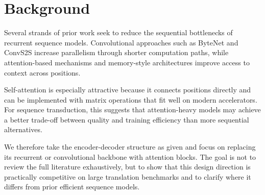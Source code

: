 \section{Background}

Several strands of prior work seek to reduce the sequential bottlenecks of recurrent sequence models. Convolutional approaches such as ByteNet and ConvS2S increase parallelism through shorter computation paths, while attention-based mechanisms and memory-style architectures improve access to context across positions.

Self-attention is especially attractive because it connects positions directly and can be implemented with matrix operations that fit well on modern accelerators. For sequence transduction, this suggests that attention-heavy models may achieve a better trade-off between quality and training efficiency than more sequential alternatives.


We therefore take the encoder-decoder structure as given and focus on replacing its recurrent or convolutional backbone with attention blocks. The goal is not to review the full literature exhaustively, but to show that this design direction is practically competitive on large translation benchmarks and to clarify where it differs from prior efficient sequence models.
